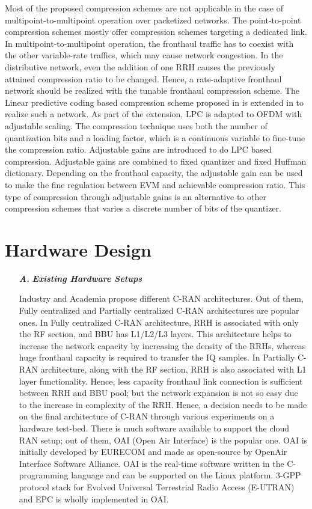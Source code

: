 \begin{multicols}{2}
\begin{itemize}
Most of the proposed compression schemes are not applicable in the case of multipoint-to-multipoint operation over packetized networks. The point-to-point compression schemes mostly offer compression schemes targeting a dedicated link. In multipoint-to-multipoint operation, the fronthaul traffic has to coexist with the other variable-rate traffics, which may cause network congestion. In the distributive network, even the addition of one RRH causes the previously attained compression ratio to be changed. Hence, a rate-adaptive fronthaul network should be realized with the tunable fronthaul compression scheme. The Linear predictive coding based compression scheme proposed in \cite{art3-key71} is extended in \cite{art3-key73} to realize such a network. As part of the extension, LPC is adapted to OFDM with adjustable scaling. The compression technique uses both the number of quantization bits and a loading factor, which is a continuous variable to fine-tune the compression ratio. Adjustable gains are introduced to do LPC based compression. Adjustable gains are combined to fixed quantizer and fixed Huffman dictionary. Depending on the fronthaul capacity, the adjustable gain can be used to make the fine regulation between EVM and achievable compression ratio. This type of compression through adjustable gains is an alternative to other compression schemes that varies a discrete number of bits of the quantizer.
\end{itemize}

\section{Hardware Design}\label{sect07}

\begin{itemize}
\item[{\textit{\textbf{ A.}}}] {\textit{\textbf{Existing Hardware Setups}}}

Industry and Academia propose different C-RAN architectures. Out of them, Fully centralized and Partially centralized C-RAN architectures are popular ones. In Fully centralized C-RAN architecture, RRH is associated with only the RF section, and BBU has L1/L2/L3 layers. This architecture helps to increase the network capacity by increasing the density of the RRHs, whereas huge fronthaul capacity is required to transfer the IQ samples. In Partially C-RAN architecture, along with the RF section, RRH is also associated with L1 layer functionality. Hence, less capacity fronthaul link connection is sufficient between RRH and BBU pool; but the network expansion is not so easy due to the increase in complexity of the RRH. Hence, a decision needs to be made on the final architecture of C-RAN through various experiments on a hardware test-bed. There is much software available to support the cloud RAN setup; out of them, OAI (Open Air Interface) is the popular one. OAI is initially developed by EURECOM and made as open-source by OpenAir Interface Software Alliance. OAI is the real-time software written in the C-programming language and can be supported on the Linux platform. 3-GPP protocol stack for Evolved Universal Terrestrial Radio Access (E-UTRAN) and EPC is wholly implemented in OAI.


\end{itemize}
\end{multicols}
